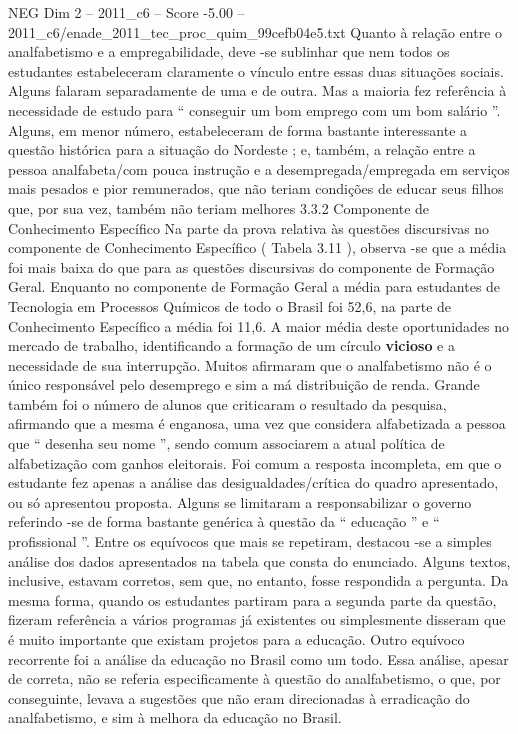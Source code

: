\begin{textsample}{NEG Dim 2 – 2011\_c6 – Score -5.00 – 2011\_c6/enade\_2011\_tec\_proc\_quim\_99cefb04e5.txt}
Quanto à relação entre o analfabetismo e a empregabilidade, deve -se sublinhar que nem todos os estudantes estabeleceram claramente o vínculo entre essas duas situações sociais.
Alguns falaram separadamente de uma e de outra.
Mas a maioria fez referência à necessidade de estudo para “ conseguir um bom emprego com um bom salário ”.
Alguns, em menor número, estabeleceram de forma bastante interessante a questão histórica para a situação do Nordeste ; e, também, a relação entre a pessoa analfabeta/com pouca instrução e a desempregada/empregada em serviços mais pesados e pior remunerados, que não teriam condições de educar seus filhos que, por sua vez, também não teriam melhores 3.3.2 Componente de Conhecimento Específico Na parte da prova relativa às questões discursivas no componente de Conhecimento Específico ( Tabela 3.11 ), observa -se que a média foi mais baixa do que para as questões discursivas do componente de Formação Geral.
Enquanto no componente de Formação Geral a média para estudantes de Tecnologia em Processos Químicos de todo o Brasil foi 52,6, na parte de Conhecimento Específico a média foi 11,6.
A maior média deste oportunidades no mercado de trabalho, identificando a formação de um círculo \textbf{vicioso} e a necessidade de sua interrupção.
Muitos afirmaram que o analfabetismo não é o único responsável pelo desemprego e sim a má distribuição de renda.
Grande também foi o número de alunos que criticaram o resultado da pesquisa, afirmando que a mesma é enganosa, uma vez que considera alfabetizada a pessoa que “ desenha seu nome ”, sendo comum associarem a atual política de alfabetização com ganhos eleitorais.
Foi comum a resposta incompleta, em que o estudante fez apenas a análise das desigualdades/crítica do quadro apresentado, ou só apresentou proposta.
Alguns se limitaram a responsabilizar o governo referindo -se de forma bastante genérica à questão da “ educação ” e “ profissional ”.
Entre os equívocos que mais se repetiram, destacou -se a simples análise dos dados apresentados na tabela que consta do enunciado.
Alguns textos, inclusive, estavam corretos, sem que, no entanto, fosse respondida a pergunta.
Da mesma forma, quando os estudantes partiram para a segunda parte da questão, fizeram referência a vários programas já existentes ou simplesmente disseram que é muito importante que existam projetos para a educação.
Outro equívoco recorrente foi a análise da educação no Brasil como um todo.
Essa análise, apesar de correta, não se referia especificamente à questão do analfabetismo, o que, por conseguinte, levava a sugestões que não eram direcionadas à erradicação do analfabetismo, e sim à melhora da educação no Brasil.

\end{textsample}
